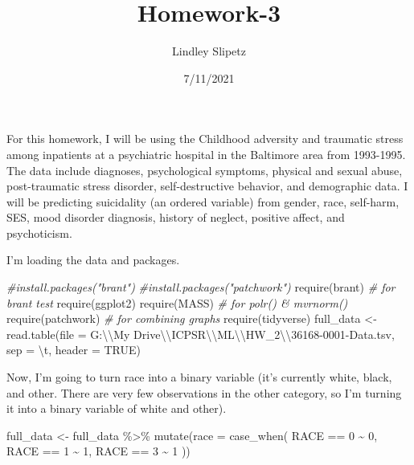\documentclass[
]{article}
\title{Homework-3}
\author{Lindley Slipetz}
\date{7/11/2021}
\newenvironment{Shaded}{\begin{snugshade}}{\end{snugshade}}
\newcommand{\AttributeTok}[1]{\textcolor[rgb]{0.77,0.63,0.00}{#1}}
\newcommand{\CommentTok}[1]{\textcolor[rgb]{0.56,0.35,0.01}{\textit{#1}}}
\newcommand{\ConstantTok}[1]{\textcolor[rgb]{0.00,0.00,0.00}{#1}}
\newcommand{\DecValTok}[1]{\textcolor[rgb]{0.00,0.00,0.81}{#1}}
\newcommand{\FunctionTok}[1]{\textcolor[rgb]{0.00,0.00,0.00}{#1}}
\newcommand{\NormalTok}[1]{#1}
\newcommand{\OtherTok}[1]{\textcolor[rgb]{0.56,0.35,0.01}{#1}}
\newcommand{\SpecialCharTok}[1]{\textcolor[rgb]{0.00,0.00,0.00}{#1}}
\newcommand{\StringTok}[1]{\textcolor[rgb]{0.31,0.60,0.02}{#1}}
\begin{document}
\maketitle

For this homework, I will be using the Childhood adversity and traumatic
stress among inpatients at a psychiatric hospital in the Baltimore area
from 1993-1995. The data include diagnoses, psychological symptoms,
physical and sexual abuse, post-traumatic stress disorder,
self-destructive behavior, and demographic data. I will be predicting
suicidality (an ordered variable) from gender, race, self-harm, SES,
mood disorder diagnosis, history of neglect, positive affect, and
psychoticism.

I'm loading the data and packages.

\begin{Shaded}
\begin{Highlighting}[]
\CommentTok{\#install.packages("brant")}
\CommentTok{\#install.packages("patchwork")}
\FunctionTok{require}\NormalTok{(brant) }\CommentTok{\# for brant test}
\FunctionTok{require}\NormalTok{(ggplot2)}
\FunctionTok{require}\NormalTok{(MASS) }\CommentTok{\# for polr() \& mvrnorm()}
\FunctionTok{require}\NormalTok{(patchwork) }\CommentTok{\# for combining graphs}
\FunctionTok{require}\NormalTok{(tidyverse)}
\NormalTok{full\_data }\OtherTok{\textless{}{-}} \FunctionTok{read.table}\NormalTok{(}\AttributeTok{file =} \StringTok{\textquotesingle{}G:}\SpecialCharTok{\textbackslash{}\textbackslash{}}\StringTok{My Drive}\SpecialCharTok{\textbackslash{}\textbackslash{}}\StringTok{ICPSR}\SpecialCharTok{\textbackslash{}\textbackslash{}}\StringTok{ML}\SpecialCharTok{\textbackslash{}\textbackslash{}}\StringTok{HW\_2}\SpecialCharTok{\textbackslash{}\textbackslash{}}\StringTok{36168{-}0001{-}Data.tsv\textquotesingle{}}\NormalTok{, }\AttributeTok{sep =} \StringTok{\textquotesingle{}}\SpecialCharTok{\textbackslash{}t}\StringTok{\textquotesingle{}}\NormalTok{, }\AttributeTok{header =} \ConstantTok{TRUE}\NormalTok{)}
\end{Highlighting}
\end{Shaded}

Now, I'm going to turn race into a binary variable (it's currently
white, black, and other. There are very few observations in the other
category, so I'm turning it into a binary variable of white and other).

\begin{Shaded}
\begin{Highlighting}[]
\NormalTok{full\_data }\OtherTok{\textless{}{-}}\NormalTok{ full\_data }\SpecialCharTok{\%\textgreater{}\%}
  \FunctionTok{mutate}\NormalTok{(}\AttributeTok{race =} \FunctionTok{case\_when}\NormalTok{(}
\NormalTok{    RACE }\SpecialCharTok{==} \DecValTok{0} \SpecialCharTok{\textasciitilde{}} \DecValTok{0}\NormalTok{,}
\NormalTok{    RACE }\SpecialCharTok{==} \DecValTok{1} \SpecialCharTok{\textasciitilde{}} \DecValTok{1}\NormalTok{,}
\NormalTok{    RACE }\SpecialCharTok{==} \DecValTok{3} \SpecialCharTok{\textasciitilde{}} \DecValTok{1}
\NormalTok{  ))}
\end{Highlighting}
\end{Shaded}
\end{document}

